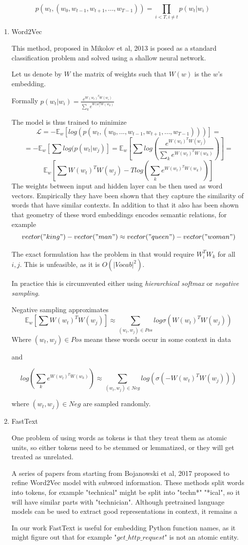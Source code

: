 \documentclass[11pt]{report}
\begin{document}
$$p(w_t, (w_0, w_{t-1}, w_{t+1}, ..., w_{T-1})) = \prod_{i < T, i \neq t} p( w_t|w_i)$$


\begin{enumerate}
\item Word2Vec

This method, proposed in Mikolov et al, 2013 \cite{word2vec} is posed as a standard classification problem and solved using a shallow neural network.

Let us denote by \(W\) the matrix of weights such that \(W(w)\) is the \(w\)'s embedding.

Formally \(p( w_t|w_i) = \frac{e^{W(w_t)^T W(w_i)}}{\sum_k e^{W(w_)^T W(w_k)}}\)

The model is thus trained to minimize
$$\mathcal{L} = -\mathbb{E}_w[log( p(w_t, (w_0, ..., w_{t-1}, w_{t+1}, ..., w_{T-1})))] = $$
$$ = -\mathbb{E}_w[\sum log( p( w_t|w_j)] = \mathbb{E}_w[\sum log(\frac{e^{W(w_t)^T W(w_j)}}{\sum_k e^{W(w_t)^T W(w_k)}} )] = $$
$$ \mathbb{E}_w[\sum W(w_t)^T W(w_j) - T log({\sum_k e^{W(w_t)^T W(w_k)}} )]$$
The weights between input and hidden layer can be then used as word vectors.
Empirically they have been shown that they capture the similarity of words that have similar contexts.
In addition to that it also has been shown that geometry of these word embeddings encodes semantic relations, for example
$$vector("king") - vector("man") \approx vector("queen") - vector("woman")$$

The exact formulation has the problem in that would require \(W_i^T W_k\) for all \(i, j\).
This is unfeasible, as it is \(O(|Vocab|^2)\).

In practice this is circumvented either using \emph{hierarchical softmax} or \emph{negative sampling}.

Negative sampling approximates 
$$ \mathbb{E}_w[\sum W(w_t)^T W(w_j)] \approx  \sum_{(w_t, w_j) \in Pos}log \sigma(W(w_t)^T W(w_j))$$
Where \((w_t, w_j) \in Pos\) means these words occur in some context in data

and

$$ log({\sum_k e^{W(w_t)^T W(w_k)}} ) \approx \sum_{(w_t, w_j) \in Neg} log(\sigma(-W(w_t)^T W(w_j)))$$

where \((w_t, w_j) \in Neg\) are sampled randomly. 

\item FastText

One problem of using words as tokens is that they treat them as atomic units, so either tokens need to be stemmed or lemmatized,
or they will get treated as unrelated.

A series of papers from starting from 
Bojanowski et al, 2017 \cite{fasttext} proposed to refine Word2Vec model with subword information.
These methods split words into tokens, for example "technical" might be split into "techn*" "*ical",
so it will have similar parts with "technician".
Although pretrained language models can be used to extract good representations in context, it remains a 

In our work FastText is useful for embedding Python function names,
as it might figure out that for example "\(get\_http\_request\)" is not an atomic entity.
\end{enumerate}
\end{document}
